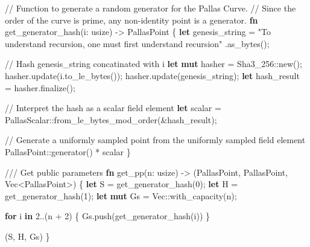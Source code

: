 \documentclass[
]{article}
\newenvironment{Shaded}{\begin{snugshade}}{\end{snugshade}}
\newcommand{\CommentTok}[1]{\textcolor[rgb]{0.49,0.44,0.39}{#1}}
\newcommand{\ControlFlowTok}[1]{\textcolor[rgb]{0.80,0.14,0.11}{\textbf{#1}}}
\newcommand{\DataTypeTok}[1]{\textcolor[rgb]{0.71,0.46,0.08}{#1}}
\newcommand{\DecValTok}[1]{\textcolor[rgb]{0.56,0.25,0.44}{#1}}
\newcommand{\KeywordTok}[1]{\textcolor[rgb]{0.80,0.14,0.11}{\textbf{#1}}}
\newcommand{\NormalTok}[1]{\textcolor[rgb]{0.16,0.16,0.16}{#1}}
\newcommand{\OperatorTok}[1]{\textcolor[rgb]{0.56,0.25,0.44}{#1}}
\newcommand{\PreprocessorTok}[1]{\textcolor[rgb]{0.03,0.40,0.47}{#1}}
\newcommand{\StringTok}[1]{\textcolor[rgb]{0.60,0.59,0.10}{#1}}
\begin{document}
\begin{Shaded}
\begin{Highlighting}[numbers=left,,]
\CommentTok{// Function to generate a random generator for the Pallas Curve.}
\CommentTok{// Since the order of the curve is prime, any non{-}identity point is a generator.}
\KeywordTok{fn}\NormalTok{ get\_generator\_hash(i}\OperatorTok{:} \DataTypeTok{usize}\NormalTok{) }\OperatorTok{{-}\textgreater{}}\NormalTok{ PallasPoint }\OperatorTok{\{}
    \KeywordTok{let}\NormalTok{ genesis\_string }\OperatorTok{=} \StringTok{"To understand recursion, one must first understand recursion"}
      \OperatorTok{.}\NormalTok{as\_bytes()}\OperatorTok{;}

    \CommentTok{// Hash \textasciigrave{}genesis\_string\textasciigrave{} concatinated with \textasciigrave{}i\textasciigrave{}}
    \KeywordTok{let} \KeywordTok{mut}\NormalTok{ hasher }\OperatorTok{=} \PreprocessorTok{Sha3\_256::}\NormalTok{new()}\OperatorTok{;}
\NormalTok{    hasher}\OperatorTok{.}\NormalTok{update(i}\OperatorTok{.}\NormalTok{to\_le\_bytes())}\OperatorTok{;}
\NormalTok{    hasher}\OperatorTok{.}\NormalTok{update(genesis\_string)}\OperatorTok{;}
    \KeywordTok{let}\NormalTok{ hash\_result }\OperatorTok{=}\NormalTok{ hasher}\OperatorTok{.}\NormalTok{finalize()}\OperatorTok{;}

    \CommentTok{// Interpret the hash as a scalar field element}
    \KeywordTok{let}\NormalTok{ scalar }\OperatorTok{=} \PreprocessorTok{PallasScalar::}\NormalTok{from\_le\_bytes\_mod\_order(}\OperatorTok{\&}\NormalTok{hash\_result)}\OperatorTok{;}

    \CommentTok{// Generate a uniformly sampled point from the uniformly sampled field element}
    \PreprocessorTok{PallasPoint::}\NormalTok{generator() }\OperatorTok{*}\NormalTok{ scalar}
\OperatorTok{\}}

\CommentTok{/// Get public parameters}
\KeywordTok{fn}\NormalTok{ get\_pp(n}\OperatorTok{:} \DataTypeTok{usize}\NormalTok{) }\OperatorTok{{-}\textgreater{}}\NormalTok{ (PallasPoint}\OperatorTok{,}\NormalTok{ PallasPoint}\OperatorTok{,} \DataTypeTok{Vec}\OperatorTok{\textless{}}\NormalTok{PallasPoint}\OperatorTok{\textgreater{}}\NormalTok{) }\OperatorTok{\{}
    \KeywordTok{let}\NormalTok{ S }\OperatorTok{=}\NormalTok{ get\_generator\_hash(}\DecValTok{0}\NormalTok{)}\OperatorTok{;}
    \KeywordTok{let}\NormalTok{ H }\OperatorTok{=}\NormalTok{ get\_generator\_hash(}\DecValTok{1}\NormalTok{)}\OperatorTok{;}
    \KeywordTok{let} \KeywordTok{mut}\NormalTok{ Gs }\OperatorTok{=} \DataTypeTok{Vec}\PreprocessorTok{::}\NormalTok{with\_capacity(n)}\OperatorTok{;}

    \ControlFlowTok{for}\NormalTok{ i }\KeywordTok{in} \DecValTok{2}\OperatorTok{..}\NormalTok{(n }\OperatorTok{+} \DecValTok{2}\NormalTok{) }\OperatorTok{\{}
\NormalTok{        Gs}\OperatorTok{.}\NormalTok{push(get\_generator\_hash(i))}
    \OperatorTok{\}}

\NormalTok{    (S}\OperatorTok{,}\NormalTok{ H}\OperatorTok{,}\NormalTok{ Gs)}
\OperatorTok{\}}
\end{Highlighting}
\end{Shaded}
\end{document}
